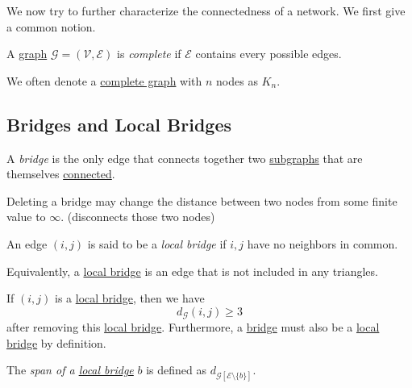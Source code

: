 We now try to further characterize the connectedness of a network. We first give a common notion.
\begin{definition}\label{def:complete-graph}
	A \hyperref[def:graph]{graph} \(\mathcal{G} = (\mathcal{V} , \mathcal{E} )\) is \emph{complete} if \(\mathcal{E} \) contains every possible edges.
\end{definition}

\begin{notation}
	We often denote a \hyperref[def:complete-graph]{complete graph} with \(n\) nodes as \(K_n\).
\end{notation}

\subsection{Bridges and Local Bridges}
\begin{definition}[Bridge]\label{def:bridge}
	A \emph{bridge} is the only edge that connects together two \hyperref[def:subgraph]{subgraphs} that are themselves \hyperref[def:connected]{connected}.
\end{definition}

\begin{remark}
	Deleting a bridge may change the distance between two nodes from some finite value to \(\infty\). (disconnects those two nodes)
\end{remark}

\begin{definition}\label{def:local-bridge}
	An edge \((i, j)\) is said to be a \emph{local bridge} if \(i, j\) have no neighbors in common.
\end{definition}

\begin{note}
	Equivalently, a \hyperref[def:local-bridge]{local bridge} is an edge that is not included in any triangles.
\end{note}

\begin{remark}
	If \((i, j)\) is a \hyperref[def:local-bridge]{local bridge}, then we have
	\[
		d_{\mathcal{G}}(i, j) \geq  3
	\]
	after removing this \hyperref[def:local-bridge]{local bridge}. Furthermore, a \hyperref[def:bridge]{bridge} must also be a \hyperref[def:local-bridge]{local bridge} by definition.
\end{remark}

\begin{definition}
	The \emph{span of a \hyperref[def:local-bridge]{local bridge}} \(b\) is defined as \(d_{\mathcal{G}[\mathcal{E} \setminus \{b\}]}\).
\end{definition}

